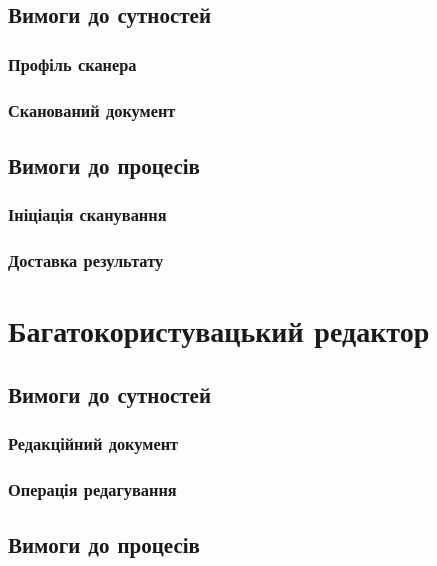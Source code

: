 \subsection{Вимоги до сутностей}

\subsubsection{Профіль сканера}

\subsubsection{Сканований документ}

\subsection{Вимоги до процесів}

\subsubsection{Ініціація сканування}

\subsubsection{Доставка результату}

\newpage
\section{Багатокористувацький редактор}

\subsection{Вимоги до сутностей}

\subsubsection{Редакційний документ}

\subsubsection{Операція редагування}

\subsection{Вимоги до процесів}

